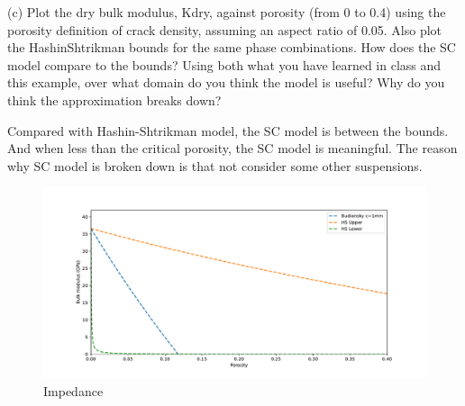 \begin{problem}{(c)}
    Plot the dry bulk modulus, Kdry, against porosity (from 0 to 0.4) using the porosity definition of crack density, assuming an aspect ratio of 0.05. Also plot the HashinShtrikman bounds for the same phase combinations. How does the SC model compare to the bounds? Using both what you have learned in class and this example, over what domain do you think the model is useful? Why do you think the approximation breaks down?
\end{problem}
\begin{solution}
    Compared with Hashin-Shtrikman model, the SC model is between the bounds.
    And when less than the critical porosity, the SC model is meaningful.
    The reason why SC model is broken down is that not consider some other suspensions.
    \begin{figure}[H]
        \centering
        \includegraphics[width=1\textwidth]{figures/homework-2/p2-c.pdf}
        \caption{Impedance}
        \label{fig:p2-c}
    \end{figure}
\end{solution}



